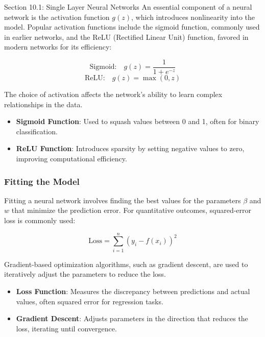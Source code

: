\begin{notes}{Section 10.1: Single Layer Neural Networks}
    An essential component of a neural network is the activation function $g(z)$, which introduces nonlinearity into the model. Popular activation functions include the sigmoid function, commonly used 
    in earlier networks, and the ReLU (Rectified Linear Unit) function, favored in modern networks for its efficiency:
    
    \[
    \text{Sigmoid:} \quad g(z) = \frac{1}{1 + e^{-z}}
    \]
    \[
    \text{ReLU:} \quad g(z) = \max(0, z)
    \]
    
    The choice of activation affects the network's ability to learn complex relationships in the data.
    
    \begin{highlight}
        \begin{itemize}
            \item \textbf{Sigmoid Function}: Used to squash values between 0 and 1, often for binary classification.
            \item \textbf{ReLU Function}: Introduces sparsity by setting negative values to zero, improving computational efficiency.
        \end{itemize}
    \end{highlight}
    
    \subsubsection*{Fitting the Model}
    
    Fitting a neural network involves finding the best values for the parameters $\beta$ and $w$ that minimize the prediction error. For quantitative outcomes, squared-error loss is commonly used:
    
    \[
    \text{Loss} = \sum_{i=1}^n (y_i - f(x_i))^2
    \]
    
    Gradient-based optimization algorithms, such as gradient descent, are used to iteratively adjust the parameters to reduce the loss.
    
    \begin{highlight}
        \begin{itemize}
            \item \textbf{Loss Function}: Measures the discrepancy between predictions and actual values, often squared error for regression tasks.
            \item \textbf{Gradient Descent}: Adjusts parameters in the direction that reduces the loss, iterating until convergence.
        \end{itemize}
    \end{highlight}
    

\end{notes}
